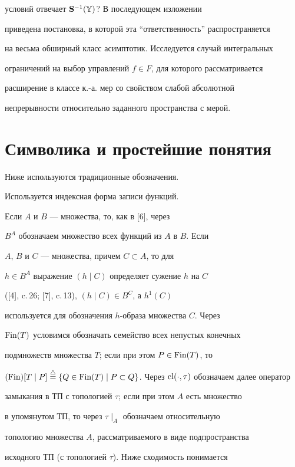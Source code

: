условий отвечает $\bold S^{-1}(\Bbb Y)$? В последующем изложении


приведена постановка, в которой эта ``ответственность'' распространяется


на весьма обширный класс асимптотик. Исследуется случай интегральных


ограничений на выбор управлений $f\in F$, для которого рассматривается


расширение в классе к.-а. мер со свойством слабой абсолютной


непрерывности относительно заданного пространства с мерой.





\section{Символика и простейшие понятия}





Ниже используются традиционные обозначения.


Используется индексная форма записи функций.


Если $A$ и $B$ --- множества, то, как в [6], через


$B^A$ обозначаем множество всех функций из $A$ в $B$. Если


$A$, $B$ и $C$ --- множества, причем $C\subset A$, то для


$h\in B^A$ выражение $(h\mid C)$ определяет сужение $h$ на $C$


([4], c.\,26; [7], c.\,13), $(h\mid C)\in B^C$, а $h^1(C)$


используется для обозначения $h$-образа множества $C$. Через


$\operatorname{Fin}(T)$ условимся обозначать семейство всех непустых конечных


подмножеств множества $T$; если при этом $P\in\operatorname{Fin}(T)$, то


$(\Fin)[T\mid P]\overset{\triangle}{=}\{Q\in\Fin(T)\mid


P\subset Q\}$. Через $\cl(\cdot,\tau)$ обозначаем далее оператор


замыкания в ТП с топологией $\tau$; если при этом $A$ есть множество


в упомянутом ТП, то через $\tau\mid_A$ обозначаем относительную


топологию множества $A$, рассматриваемого в виде подпространства


исходного ТП (с топологией $\tau$). Ниже сходимость понимается



